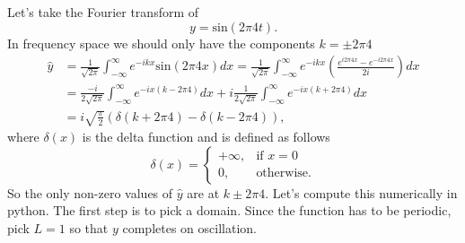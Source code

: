 \documentclass{article}
\begin{document}
Let's take the Fourier transform of 
\begin{equation*}
y = \mathrm{sin}(2\pi 4t).
\end{equation*}
In frequency space we should only have the components $k=\pm2\pi 4$ 
\begin{align*}
\widehat{y} &= \frac{1}{\sqrt{2\pi}}\int_{-\infty}^{\infty} e^{-ikx} \mathrm{sin}(2\pi 4x)dx =\frac{1}{\sqrt{2\pi}}\int_{-\infty}^{\infty} e^{-ikx} \left(\frac{e^{i2\pi 4x}-e^{-i2\pi 4x}}{2i}\right)dx\\
&=\frac{-i}{2\sqrt{2\pi}}\int_{-\infty}^{\infty} e^{-ix(k-2\pi 4)}dx + i\frac{1}{2\sqrt{2\pi}}\int_{-\infty}^{\infty} e^{-ix(k +2\pi 4)}dx\\
&=i\sqrt{\frac{\pi}{2}}\left(\delta(k+2\pi 4) - \delta(k-2\pi 4)\right),
\end{align*}
where $\delta(x)$ is the delta function and is defined as follows
\[
    \delta(x)= 
\begin{cases}
    +\infty, & \text{if } x=0\\
    0,              & \text{otherwise.}
\end{cases}
\]
So the only non-zero values of $\widehat{y}$ are at $k\pm 2\pi 4$. Let's compute this numerically in python. The first step is to pick a domain. Since the function has to be periodic, pick $L=1$ so that $y$ completes on oscillation.
%
\end{document}
